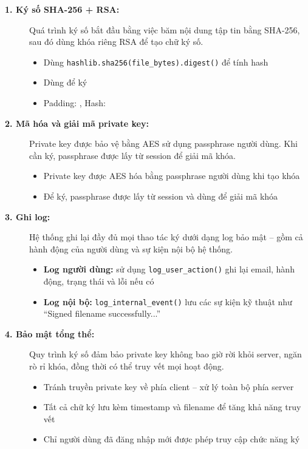 \begin{description}

    \item[\textbf{1. Ký số SHA-256 + RSA:}]
    Quá trình ký số bắt đầu bằng việc băm nội dung tập tin bằng SHA-256, sau đó dùng khóa riêng RSA để tạo chữ ký số.
    \begin{itemize}
        \item Dùng \texttt{hashlib.sha256(file\_bytes).digest()} để tính hash
        \item Dùng  để ký
        \item Padding: , Hash: 
    \end{itemize}

    \item[\textbf{2. Mã hóa và giải mã private key:}]
    Private key được bảo vệ bằng AES sử dụng passphrase người dùng. Khi cần ký, passphrase được lấy từ session để giải mã khóa.
    \begin{itemize}
        \item Private key được AES hóa bằng passphrase người dùng khi tạo khóa
        \item Để ký, passphrase được lấy từ session và dùng để giải mã khóa
    \end{itemize}

    \item[\textbf{3. Ghi log:}]
    Hệ thống ghi lại đầy đủ mọi thao tác ký dưới dạng log bảo mật – gồm cả hành động của người dùng và sự kiện nội bộ hệ thống.
    \begin{itemize}
        \item \textbf{Log người dùng:} sử dụng \texttt{log\_user\_action()} ghi lại email, hành động, trạng thái và lỗi nếu có
        \item \textbf{Log nội bộ:} \texttt{log\_internal\_event()} lưu các sự kiện kỹ thuật như “Signed filename successfully...”
    \end{itemize}

    \item[\textbf{4. Bảo mật tổng thể:}]
    Quy trình ký số đảm bảo private key không bao giờ rời khỏi server, ngăn rò rỉ khóa, đồng thời có thể truy vết mọi hoạt động.
    \begin{itemize}
        \item Tránh truyền private key về phía client – xử lý toàn bộ phía server
        \item Tất cả chữ ký lưu kèm timestamp và filename để tăng khả năng truy vết
        \item Chỉ người dùng đã đăng nhập mới được phép truy cập chức năng ký
    \end{itemize}


\end{description}
